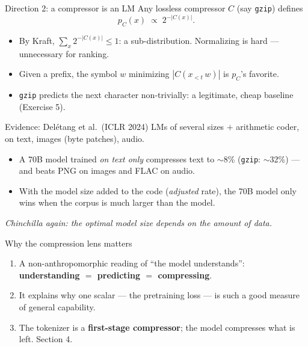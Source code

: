 \documentclass[11pt,aspectratio=169]{beamer}
\newcommand{\dest}[1]{\textcolor{structure}{\textbf{#1}}}
\newcommand{\hook}[1]{{\small\textcolor{gray!60!black}{\textit{#1}}}}
\begin{document}
\begin{frame}{Direction 2: a compressor is an LM}
  Any lossless compressor $C$ (say \texttt{gzip}) defines
  \[
    p_C(x) \;\propto\; 2^{-|C(x)|} .
  \]

  \vspace{0.8em}
  \begin{itemize}
    \item By Kraft, $\sum_x 2^{-|C(x)|}\le 1$: a sub-distribution. Normalizing is hard ---
          unnecessary for ranking.
    \item Given a prefix, the symbol $w$ minimizing $|C(x_{<t}\,w)|$ is $p_C$'s favorite.
    \item \texttt{gzip} predicts the next character non-trivially: a legitimate, cheap
          baseline (Exercise 5).
  \end{itemize}
\end{frame}

\begin{frame}{Evidence: Delétang et al.\ (ICLR 2024)}
  LMs of several sizes $+$ arithmetic coder, on text, images (byte patches), audio.

  \vspace{0.8em}
  \begin{itemize}
    \item A 70B model trained \emph{on text only} compresses text to $\sim$8\%
          (\texttt{gzip}: $\sim$32\%) --- and beats PNG on images and FLAC on audio.
    \item With the model size added to the code (\emph{adjusted} rate), the 70B model only
          wins when the corpus is much larger than the model.
  \end{itemize}

  \vspace{1em}
  \hook{Chinchilla again: the optimal model size depends on the amount of data.}
\end{frame}

\begin{frame}{Why the compression lens matters}
  \begin{enumerate}
    \item A non-anthropomorphic reading of ``the model understands'':\\
          \textbf{understanding $=$ predicting $=$ compressing}.
    \item It explains why one scalar --- the pretraining loss --- is such a good measure of
          general capability.
    \item The tokenizer is a \dest{first-stage compressor}; the model compresses what is
          left. Section 4.
  \end{enumerate}
\end{frame}
\end{document}
